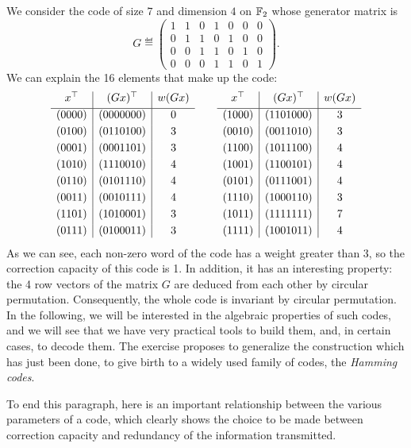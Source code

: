 
\begin{exmp}
\label{exmp-code-hamming-7}
 We consider the code of size $ 7 $ and dimension $ 4 $ on $ \mathbb{F}_2 $ whose generator matrix is
\begin{equation*}
G \eqdef \begin{pmatrix} 1 & 1 & 0 & 1 & 0 & 0 & 0 \\0 & 1 & 1 & 0 & 1 & 0 & 0 \\0 & 0 & 1 & 1 & 0 & 1 & 0 \\0 & 0 & 0 & 1 & 1 & 0 & 1 \end{pmatrix}.
\end{equation*}
We can explain the 16 elements that make up the code:
\begin{equation*}
\begin{array}{c | c | c} x^\top & (G x)^\top & w (G x) \\[1mm] \hline{(0000)} &{(0000000)} & 0 \\[1mm]{(0100 )} & (0110100) & 3 \\[1mm]{(0001)} & (0001101) & 3 \\[1mm]{(1010)} & (1110010) & 4 \\[1mm]{(0110)} & (0101110) & 4 \\[1mm]{(0011)} & (0010111) & 4 \\[1mm]{(1101)} & (1010001) & 3 \\[1mm]{(0111)} & ( 0100011) & 3 \end{array} \quad \quad \begin{array}{c | c | c} x^\top & (G x)^\top & w (G x) \\[1mm] \hline (1000) & (1101000) & 3 \\[1mm] (0010) & (0011010) & 3 \\[1mm] (1100) & (1011100) & 4 \\[1mm] (1001) & (1100101) & 4 \\[1mm] (0101) & (0111001) & 4 \\[1mm] ( 1110) & (1000110) & 3 \\[1mm] (1011) & (1111111) & 7 \\[1mm] (1111) & (1001011) & 4 \end{array}
\end{equation*}
 As we can see, each non-zero word of the code has a weight greater than 3, so the correction capacity of this code is 1. In addition, it has an interesting property: the 4 row vectors of the matrix $ G $ are deduced from each other by circular permutation. Consequently, the whole code is invariant by circular permutation. In the following, we will be interested in the algebraic properties of such codes, and we will see that we have very practical tools to build them, and, in certain cases, to decode them. The exercise  proposes to generalize the construction which has just been done, to give birth to a widely used family of codes, the \textit{Hamming codes}.
\end{exmp}
To end this paragraph, here is an important relationship between the various parameters of a code, which clearly shows the choice to be made between correction capacity and redundancy of the information transmitted.
 
